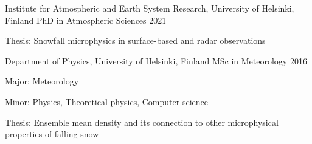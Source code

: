 

\begin{cventries}
\cventry
    {Institute for Atmospheric and Earth System Research, University of Helsinki, Finland} %
    {PhD in Atmospheric Sciences} %
    {} %
    {2021} %
    {
        \begin{cvitems} %
            \item {Thesis: Snowfall microphysics in surface-based and radar observations}
        \end{cvitems}
    }


  \cventry
    {Department of Physics, University of Helsinki, Finland} %
    {MSc in Meteorology} %
    {} %
    {2016} %
    {
        \begin{cvitems} %
            \item {Major: Meteorology}
            \item {Minor: Physics, Theoretical physics, Computer science}
            \item {Thesis: Ensemble mean density and its connection to other microphysical properties of falling snow}
        \end{cvitems}
    }

\end{cventries}
